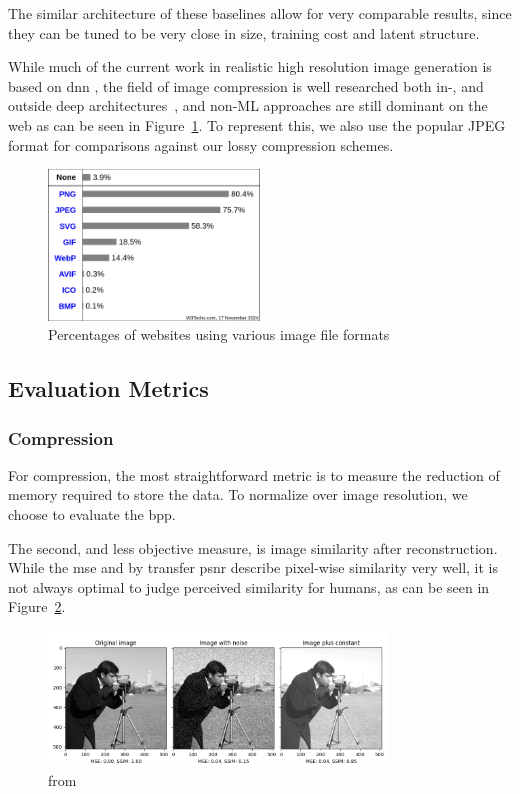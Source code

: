 \documentclass[10pt,a4paper,twoside]{article}
\begin{document}
    The similar architecture of these baselines allow for very comparable results, since they can be tuned to be very
    close in size, training cost and latent structure.

    While much of the current work in realistic high resolution image generation is based on \ac{dnn} \cite{addsources},
    the field of image compression is well researched both in-, and outside deep architectures~\cite{compression},
    and non-ML approaches are still dominant on the web as can be seen in Figure~\ref{fig:file_formats}.
    To represent this, we also use the popular JPEG format for comparisons against our lossy compression schemes.

    \begin{figure}[h]
        \centering
        \includegraphics[width=0.5\textwidth]{images/formats}
        \caption{Percentages of websites using various image file formats~\cite{img_file_format}}
        \label{fig:file_formats}
    \end{figure}

    \subsection{Evaluation Metrics}\label{subsec:evaluation-metrics}
    \subsubsection{Compression}
    For compression, the most straightforward metric is to measure the reduction of memory required to
    store the data.
    To normalize over image resolution, we choose to evaluate the \ac{bpp}.

    The second, and less objective measure, is image similarity after reconstruction.
    While the \ac{mse} and by transfer \ac{psnr} describe pixel-wise similarity very well, it is not
    always optimal to judge perceived similarity for humans, as can be seen in Figure~\ref{fig:mse_ssim}.

    \begin{figure}[h]
        \centering
        \includegraphics[width=0.8\textwidth]{images/ssim_mse}
        \caption{from~\cite{scikit-ssim}}
        \label{fig:mse_ssim}
    \end{figure}
\end{document}
